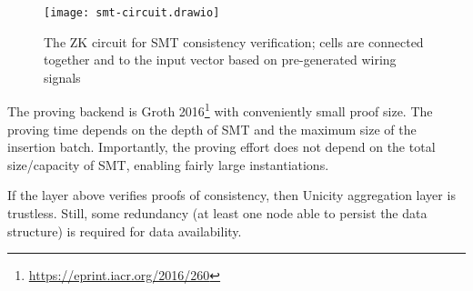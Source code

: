 \begin{figure}[htb]
    \centering
    \texttt{[image: smt-circuit.drawio]}
    \caption{The ZK circuit for SMT consistency verification; cells are connected together and to the input vector based on pre-generated wiring signals}
    \label{fig:zk-circuit}
\end{figure}

The proving backend is Groth 2016\footnote{\url{https://eprint.iacr.org/2016/260}} with conveniently small proof size. The proving time depends on the depth of SMT and the maximum size of the insertion batch. Importantly, the proving effort does not depend on the total size/capacity of SMT, enabling fairly large instantiations.

If the layer above verifies proofs of consistency, then Unicity aggregation layer is trustless. Still, some redundancy (at least one node able to persist the data structure) is required for data availability.
